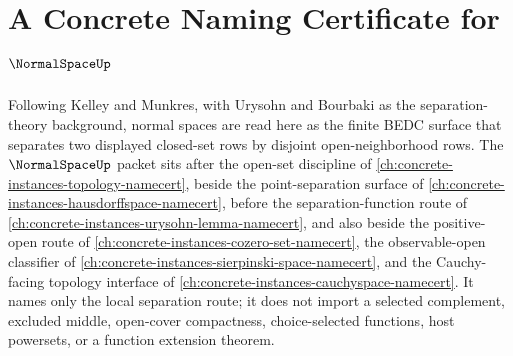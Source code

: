 \chapter{A Concrete Naming Certificate for $\NormalSpaceUp$}
\label{ch:concrete-instances-normalspace-namecert}

Following Kelley and Munkres, with Urysohn and Bourbaki as the separation-theory background, normal spaces are read here as the finite BEDC surface that separates two displayed closed-set rows by disjoint open-neighborhood rows. The $\NormalSpaceUp$ packet sits after the open-set discipline of \autoref{ch:concrete-instances-topology-namecert}, beside the point-separation surface of \autoref{ch:concrete-instances-hausdorffspace-namecert}, before the separation-function route of \autoref{ch:concrete-instances-urysohn-lemma-namecert}, and also beside the positive-open route of \autoref{ch:concrete-instances-cozero-set-namecert}, the observable-open classifier of \autoref{ch:concrete-instances-sierpinski-space-namecert}, and the Cauchy-facing topology interface of \autoref{ch:concrete-instances-cauchyspace-namecert}. It names only the local separation route; it does not import a selected complement, excluded middle, open-cover compactness, choice-selected functions, host powersets, or a function extension theorem.

